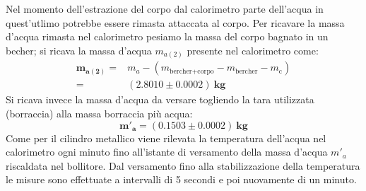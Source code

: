 \documentclass{article}
\begin{document}
	Nel momento dell'estrazione del corpo dal calorimetro parte dell'acqua in quest'utlimo potrebbe essere rimasta attaccata al corpo. Per ricavare la massa d'acqua rimasta nel calorimetro pesiamo la massa del corpo bagnato in un becher; si ricava la massa d'acqua \(m_{a(2)}\) presente nel calorimetro come:
	\begin{align*}
		\boldsymbol{	m_{a(2)} =}& m_{a} - (m_{\text{bercher+corpo}} - m_{\text{bercher}} - m_{\text{c}}) \\
		\boldsymbol{=}& \boldsymbol{(2.8010 \pm 0.0002) \SI{}{\kilogram}}
	\end{align*}
	Si ricava invece la massa d'acqua da versare togliendo la tara utilizzata (borraccia) alla massa borraccia più acqua:
	\[ 
	\boldsymbol{m'_{a} = (0.1503 \pm	0.0002)\SI{}{\kilogram}}
	\]
	Come per il cilindro metallico viene rilevata la temperatura dell'acqua nel calorimetro ogni minuto fino all'istante di versamento della massa d'acqua \(m'_{a}\) riscaldata nel bollitore. Dal versamento fino alla stabilizzazione della temperatura le misure sono effettuate a intervalli di 5 secondi e poi nuovamente di un minuto.
	
\end{document}
